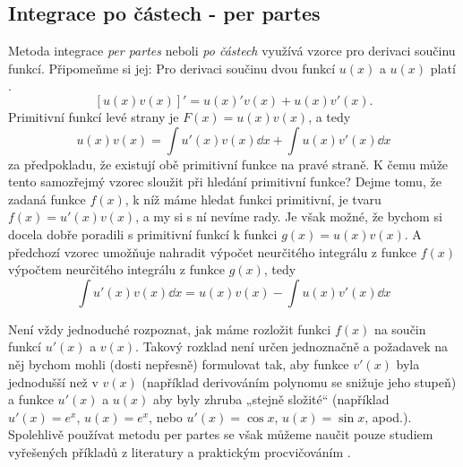     \subsection{Integrace po částech - per partes}
      Metoda integrace \emph{per partes} neboli \emph{po částech} využívá vzorce pro derivaci 
      součinu funkcí. Připomeňme si jej: Pro derivaci součinu dvou funkcí \(u(x)\) a \(u(x)\) platí
      \cite[p.~137]{Musilova2009MA1}.
      \begin{equation}\label{MA:eq_Int29}
        [u(x)v(x)]' = u(x)'v(x) + u(x)v'(x).
      \end{equation} 
      Primitivní funkcí levé strany je \(F(x) = u(x)v(x)\), a tedy
      \begin{equation*}
        u(x)v(x) =  \int u'(x)v(x)\dd{x} + \int u(x)v'(x)\dd{x}
      \end{equation*}  
      za předpokladu, že existují obě primitivní funkce na pravé straně. K čemu může tento
      samozřejmý vzorec sloužit při hledání primitivní funkce? Dejme tomu, že zadaná funkce
      \(f(x)\), k níž máme hledat funkci primitivní, je tvaru \(f(x) = u'(x)v(x)\), a my si s ní
      nevíme rady. Je však možné, že bychom si docela dobře poradili s primitivní funkcí k funkci
      \(g(x) = u(x)v(x)\). A předchozí vzorec umožňuje nahradit výpočet neurčitého integrálu z
      funkce \(f(x)\) výpočtem neurčitého integrálu z funkce \(g(x)\), tedy
      \begin{equation}\label{ma:eq_perpartes}
        \int u'(x)v(x)\dd{x} = u(x)v(x) - \int u(x)v'(x)\dd{x} 
      \end{equation}

      

      Není vždy jednoduché rozpoznat, jak máme rozložit funkci \(f(x)\) na součin funkcí \(u'(x)\) 
      a \(v(x)\). Takový rozklad není určen jednoznačně a požadavek na něj bychom mohli (dosti 
      nepřesně) formulovat tak, aby funkce \(v'(x)\) byla jednodušší než v \(v(x)\) (například 
      derivováním polynomu se snižuje jeho stupeň) a funkce \(u'(x)\) a \(u(x)\) aby byly zhruba 
      „stejně složité“ (například \(u'(x) =e^x\), \(u(x) = e^x\), nebo \(u'(x) = \cos x\), \(u(x) = 
      \sin x\), apod.). Spolehlivě používat metodu per partes se však můžeme naučit pouze studiem 
      vyřešených příkladů z literatury a praktickým procvičováním \cite[p.~138]{Musilova2009MA1}.
  
      
  
